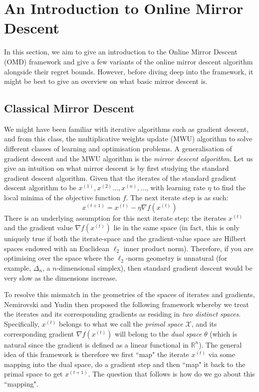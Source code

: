 \section{An Introduction to Online Mirror Descent}
In this section, we aim to give an introduction to the Online Mirror Descent (OMD) framework and give a few variants of the online mirror descent algorithm alongside their regret bounds. However, before diving deep into the framework, it might be best to give an overview on what basic mirror descent is.

\subsection{Classical Mirror Descent}
We might have been familiar with iterative algorithms such as gradient descent, and from this class, the multiplicative weights update (MWU) algorithm to solve different classes of learning and optimisation problems. A generalisation of gradient descent and the MWU algorithm is the \textit{mirror descent algorithm}. Let us give an intuition on what mirror descent is by first studying the standard gradient descent algorithm. Given that the iterates of the standard gradient descent algorithm to be $x^{(1)}, x^{(2)} \ldots, x^{(n)}, \ldots$, with learning rate $\eta$ to find the local minima of the objective function $f$. The next iterate step is as such:
\begin{equation}
    x^{(t+1)} = x^{(t)} - \eta \nabla f(x^{(t)})
\end{equation}
There is an underlying assumption for this next iterate step: the iterates $x^{(t)}$ and the gradient value $\nabla f(x^{(t)})$ lie in the same space (in fact, this is only uniquely true if both the iterate-space and the gradient-value space are Hilbert spaces endowed with an Euclidean $\ell_2$ inner product norm). Therefore, if you are optimising over the space where the $\ell_2$-norm geometry is unnatural (for example, $\Delta_n$, a $n$-dimensional simplex), then standard gradient descent would be very slow as the dimensions increase.

To resolve this mismatch in the geometries of the spaces of iterates and gradients, Nemirovski and Yudin \citep{nemirovskij1983problem} then proposed the following framework whereby we treat the iterates and its corresponding gradients as residing in \textit{two distinct spaces}. Specifically, $x^{(t)}$ belongs to what we call the \textit{primal space} $\mathcal{X}$, and its corresponding gradient $\nabla f(x^{(t)})$ will belong to the \textit{dual space} $\theta$ (which is natural since the gradient is defined as a linear functional in $\mathbb{R}^n$). The general idea of this framework is therefore we first ``map" the iterate $x^{(t)}$ via some mapping into the dual space, do a gradient step and then ``map" it back to the primal space to get $x^{(t+1)}$. The question that follows is how do we go about this ``mapping".

